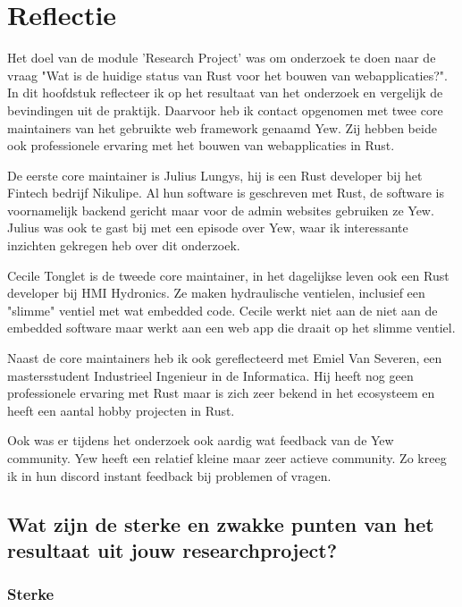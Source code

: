 \chapter{Reflectie}
\label{reflectie}

Het doel van de module 'Research Project' was om onderzoek te doen naar de vraag "Wat is de huidige
status van Rust voor het bouwen van webapplicaties?". In dit hoofdstuk reflecteer ik op het
resultaat van het onderzoek en vergelijk de bevindingen uit de praktijk. Daarvoor heb ik contact
opgenomen met twee core maintainers van het gebruikte web framework genaamd Yew. Zij hebben beide
ook professionele ervaring met het bouwen van webapplicaties in Rust.

De eerste core maintainer is Julius Lungys, hij is een Rust developer bij het Fintech bedrijf
Nikulipe. Al hun software is geschreven met Rust, de software is voornamelijk backend gericht maar
voor de admin websites gebruiken ze Yew. Julius was ook te gast bij 
\cite{podcast} met een episode over Yew, waar ik interessante inzichten gekregen heb over dit
onderzoek.

Cecile Tonglet is de tweede core maintainer, in het dagelijkse leven ook een Rust developer
bij HMI Hydronics. Ze maken hydraulische ventielen, inclusief een "slimme" ventiel met wat embedded
code. Cecile werkt niet aan de niet aan de embedded software maar werkt aan een web app die draait 
op het slimme ventiel.

Naast de core maintainers heb ik ook gereflecteerd met Emiel Van Severen, een mastersstudent
Industrieel Ingenieur in de Informatica. Hij heeft nog geen professionele ervaring met Rust maar
is zich zeer bekend in het ecosysteem en heeft een aantal hobby projecten in Rust.

Ook was er tijdens het onderzoek ook aardig wat feedback van de Yew community. Yew heeft een
relatief kleine maar zeer actieve community. Zo kreeg ik in hun discord instant feedback bij
problemen of vragen.

\clearpage

\section{Wat zijn de sterke en zwakke punten van het resultaat uit jouw researchproject?}

\subsection{Sterke}

